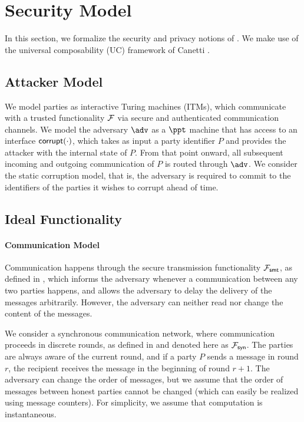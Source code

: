 \section{Security Model}
\label{sec:security-model}



In this section, we formalize the security and privacy notions of \sysname. We make use of 
the universal composability (UC) framework of Canetti \cite{canetti}.

\subsection{Attacker Model}
\label{sec:attacker-model}

We model parties as interactive Turing machines (ITMs), which communicate with a trusted 
functionality $\mathcal{F}$ via secure and authenticated communication channels. We model the 
adversary $\adv$ as a $\ppt$ machine that has access to an interface $\mathsf{corrupt}(\cdot)$, 
which takes as input a party identifier $P$ and provides the attacker with the internal 
state of $P$. From that point onward, all subsequent incoming and outgoing communication 
of $P$ is routed through $\adv$. We consider the static corruption model, that is, the 
adversary is required to commit to the identifiers of the parties it wishes to corrupt 
ahead of time.

\subsection{Ideal Functionality}
\label{sec:ideal-func}

\paragraph{Communication Model}
Communication happens through the secure transmission functionality $\mathcal{F}_{\mathsf{smt}}$, as 
defined in \cite{canetti}, which informs the adversary whenever a communication between 
any two parties happens, and allows the adversary to delay the delivery of the messages 
arbitrarily. However, the adversary can neither read nor change the content of the messages.

We consider a synchronous communication network, where communication proceeds in discrete 
rounds, as defined in \cite{kmtz} and denoted here as $\mathcal{F}_{\mathsf{syn}}$. The parties are 
always aware of the current round, and if a party $P$ sends a message in round $r$, 
the recipient receives the message in the beginning of round $r + 1$. The 
adversary can change the order of messages, but we assume that the order of messages 
between honest parties cannot be changed (which can easily be realized using message 
counters). For simplicity, we assume that computation is instantaneous.

